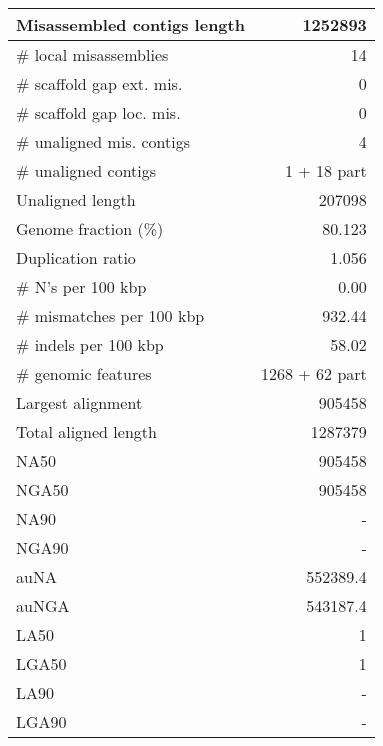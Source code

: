 \documentclass[12pt,a4paper]{article}
\begin{document}
\begin{table}[ht]
\begin{center}
\begin{tabular}{|l*{1}{|r}|}
Misassembled contigs length & 1252893 \\ \hline
\# local misassemblies & 14 \\ \hline
\# scaffold gap ext. mis. & 0 \\ \hline
\# scaffold gap loc. mis. & 0 \\ \hline
\# unaligned mis. contigs & 4 \\ \hline
\# unaligned contigs & 1 + 18 part \\ \hline
Unaligned length & 207098 \\ \hline
Genome fraction (\%) & 80.123 \\ \hline
Duplication ratio & 1.056 \\ \hline
\# N's per 100 kbp & 0.00 \\ \hline
\# mismatches per 100 kbp & 932.44 \\ \hline
\# indels per 100 kbp & 58.02 \\ \hline
\# genomic features & 1268 + 62 part \\ \hline
Largest alignment & 905458 \\ \hline
Total aligned length & 1287379 \\ \hline
NA50 & 905458 \\ \hline
NGA50 & 905458 \\ \hline
NA90 & - \\ \hline
NGA90 & - \\ \hline
auNA & 552389.4 \\ \hline
auNGA & 543187.4 \\ \hline
LA50 & 1 \\ \hline
LGA50 & 1 \\ \hline
LA90 & - \\ \hline
LGA90 & - \\ \hline
\end{tabular}
\end{center}
\end{table}
\end{document}
